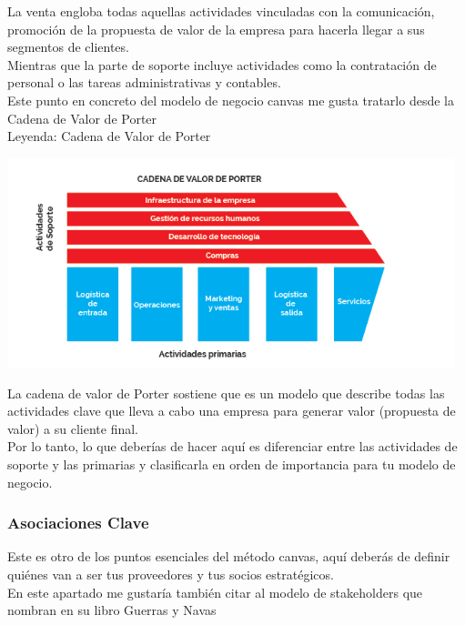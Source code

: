 \documentclass[preprint,12pt]{elsarticle}
\begin{document}
La venta engloba todas aquellas actividades vinculadas con la comunicación, promoción de la propuesta de valor de la empresa para hacerla llegar a sus segmentos de clientes.\\

Mientras que la parte de soporte incluye actividades como la contratación de personal o las tareas administrativas y contables.\\

Este punto en concreto del modelo de negocio canvas me gusta tratarlo desde la Cadena de Valor de Porter\\

Leyenda: Cadena de Valor de Porter\\

\begin{center}
	\includegraphics[width=13cm]{./Imagenes/ang1.png}
\end{center}

La cadena de valor de Porter sostiene que es un modelo que describe todas las actividades clave que lleva a cabo una empresa para generar valor (propuesta de valor) a su cliente final.\\

Por lo tanto, lo que deberías de hacer aquí es diferenciar entre las actividades de soporte y las primarias y clasificarla en orden de importancia para tu modelo de negocio.\\

\subsubsection{Asociaciones Clave}

Este es otro de los puntos esenciales del método canvas, aquí deberás de definir quiénes van a ser tus proveedores y tus socios estratégicos.\\

En este apartado me gustaría también citar al modelo de stakeholders que nombran en su libro Guerras y Navas\\
\end{document}
